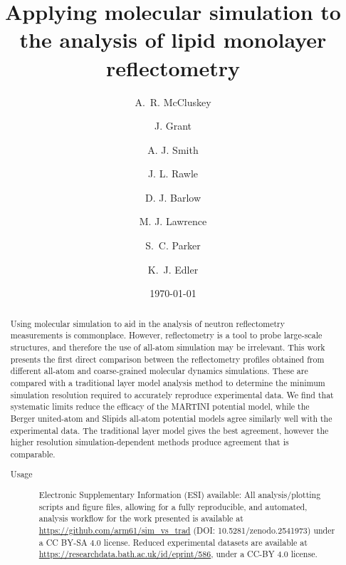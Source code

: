 \documentclass[amsmath,amssymb,twocolumn,superscriptaddress]{revtex4-1}
\begin{document}

\title{Applying molecular simulation to the analysis of lipid monolayer
reflectometry}

\author{A.~R. McCluskey}

\author{J. Grant}

\author{A. J. Smith}

\author{J. L. Rawle}

\author{D. J. Barlow}

\author{M. J. Lawrence}

\author{S.~C. Parker}

\author{K.~J. Edler}

\date{\today}

\begin{abstract}
Using molecular simulation to aid in the analysis of neutron reflectometry
measurements is commonplace.
However, reflectometry is a tool to probe large-scale structures, and
therefore the use of all-atom simulation may be irrelevant.
This work presents the first direct comparison between the reflectometry
profiles obtained from different all-atom and coarse-grained molecular
dynamics simulations.
These are compared with a traditional layer model analysis method to
determine the minimum simulation resolution required to accurately reproduce
experimental data.
We find that systematic limits reduce the efficacy of the MARTINI potential
model, while the Berger united-atom and Slipids all-atom potential models
agree similarly well with the experimental data.
The traditional layer model gives the best agreement, however the higher
resolution simulation-dependent methods produce agreement that is comparable.
\begin{description}
\item[Usage]
Electronic Supplementary Information (ESI) available: All analysis/plotting
scripts and figure files, allowing for a fully reproducible, and automated,
analysis workflow for the work presented is available at
\url{https://github.com/arm61/sim_vs_trad} (DOI: 10.5281/zenodo.2541973)
under a CC BY-SA 4.0 license.
Reduced experimental datasets are available at
\url{https://researchdata.bath.ac.uk/id/eprint/586}, under a CC-BY 4.0 license.
\end{description}
\end{abstract}
\end{document}
